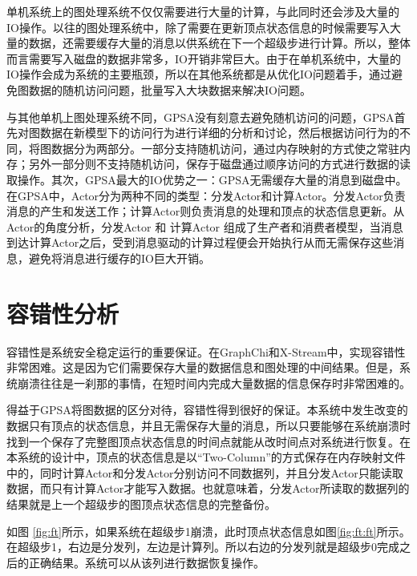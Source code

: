 单机系统上的图处理系统不仅仅需要进行大量的计算，与此同时还会涉及大量的IO操作。以往的图处理系统中，除了需要在更新顶点状态信息的时候需要写入大量的数据，还需要缓存大量的消息以供系统在下一个超级步进行计算。所以，整体而言需要写入磁盘的数据非常多，IO开销非常巨大。由于在单机系统中，大量的IO操作会成为系统的主要瓶颈，所以在其他系统都是从优化IO问题着手，通过避免图数据的随机访问问题，批量写入大块数据来解决IO问题。

与其他单机上图处理系统不同，GPSA没有刻意去避免随机访问的问题，GPSA首先对图数据在新模型下的访问行为进行详细的分析和讨论，然后根据访问行为的不同，将图数据分为两部分。一部分支持随机访问，通过内存映射的方式使之常驻内存；另外一部分则不支持随机访问，保存于磁盘通过顺序访问的方式进行数据的读取操作。其次，GPSA最大的IO优势之一：GPSA无需缓存大量的消息到磁盘中。在GPSA中，Actor分为两种不同的类型：分发Actor和计算Actor。分发Actor负责消息的产生和发送工作；计算Actor则负责消息的处理和顶点的状态信息更新。从Actor的角度分析，分发Actor 和 计算Actor 组成了生产者和消费者模型，当消息到达计算Actor之后，受到消息驱动的计算过程便会开始执行从而无需保存这些消息，避免将消息进行缓存的IO巨大开销。

\section{容错性分析}

容错性是系统安全稳定运行的重要保证。在GraphChi和X-Stream中，实现容错性非常困难。这是因为它们需要保存大量的数据信息和图处理的中间结果。但是，系统崩溃往往是一刹那的事情，在短时间内完成大量数据的信息保存时非常困难的。

得益于GPSA将图数据的区分对待，容错性得到很好的保证。本系统中发生改变的数据只有顶点的状态信息，并且无需保存大量的消息，所以只要能够在系统崩溃时找到一个保存了完整图顶点状态信息的时间点就能从改时间点对系统进行恢复。在本系统的设计中，顶点的状态信息是以“Two-Column”的方式保存在内存映射文件中的，同时计算Actor和分发Actor分别访问不同数据列，并且分发Actor只能读取数据，而只有计算Actor才能写入数据。也就意味着，分发Actor所读取的数据列的结果就是上一个超级步的图顶点状态信息的完整备份。

如图 \ref{fig:ft}所示，如果系统在超级步1崩溃，此时顶点状态信息如图\ref{fig:ft:ft}所示。在超级步1，右边是分发列，左边是计算列。所以右边的分发列就是超级步0完成之后的正确结果。系统可以从该列进行数据恢复操作。

